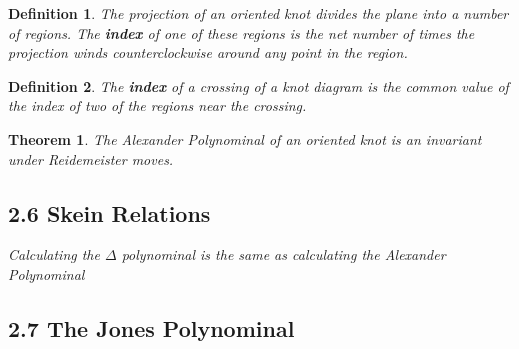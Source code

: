 \documentclass[executivepaper]{article}
\newtheorem{definition}{Definition}
\newtheorem{theorem}{Theorem}
\begin{document}
\pagebreak

\vspace*{-30mm}

\begin{tcolorbox}

\begin{definition}

\textit{The projection of an oriented knot divides the plane into a number of regions. The \textbf{index} of one of these regions is the net number of times the projection winds counterclockwise around any point in the region.}

\end{definition}

\end{tcolorbox}

\begin{tcolorbox}

\begin{definition}

\textit{The \textbf{index} of a crossing of a knot diagram is the common value of the index of two of the regions near the crossing.}

\end{definition}

\end{tcolorbox}

\begin{tcolorbox}

\begin{theorem}

\textit{The Alexander Polynominal of an oriented knot is an invariant under Reidemeister moves.}

\end{theorem}

\end{tcolorbox}

\subsection*{2.6 Skein Relations}

\begin{tcolorbox}

\textit{Calculating the $\Delta$ polynominal is the same as calculating the Alexander Polynominal}

\end{tcolorbox}

\subsection*{2.7 The Jones Polynominal}
\end{document}
